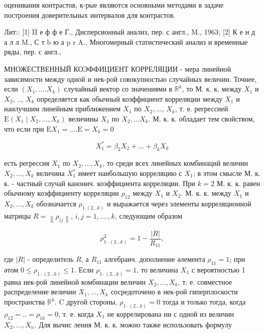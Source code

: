 \documentclass[10pt]{article}
\begin{document}
оценивания контрастов, к-рые являются основными методами в задаче построения доверительных интервалов для контрастов.



Лит:: [1] II е ф ф е Г., Дисперсионный анализ, пер. с англ., M., 1963; [2] К е н д а л л M., С т b ю а p r A., Многомерный статистический анализ и временные ряды, пер. с англ.,



МНОЖЕСТВЕННЫЙ КОЭФФИЦИЕНТ КОРРЕЛЯЦИИ - мера линейной зависимости между одной и нек-рой совокупностью случайных величин. Точнее, если $\left(X_{1}, \ldots . X_{k}\right)$ случайный вектор со значениями в $\mathbb{R}^{k}$, то М. к. к. между $X_{1}$ и $X_{2}$, .., $X_{k}$ определяется как обычный коэффициент корреляции между $X_{1}$ и наилучшим линейным приближением $X_{1}$ по $X_{2}, \ldots$, $X_{k}$, т. е. регрессией $\mathrm{E}\left(X_{1} \mid X_{2}, \ldots, X_{k}\right)$ величины $X_{1}$ по $X_{2}, \ldots X_{k}$. М. к. к. обладает тем свойством, что если при $\mathrm{E} X_{1}=\ldots . \mathrm{E}=X_{k}=0$



\[

X_{1}^{*}=\beta_{2} X_{2}+\ldots+\beta_{k} X_{k}

\]



есть регрессия $X_{1}$ по $X_{2}, \ldots, X_{k}$, то среди всех линейных комбинаций величин $X_{2}, \ldots, X_{k}$ величина $X_{1}^{*}$ имеет наибольшую корреляцию с $X_{1}$; в этом смысле М. к. к. - частный случай канонич. коэффициента корреляции. При $k=2$ М. к. к. равен обычному коэффициенту корреляции $\rho_{12}$ между $X_{1}$ и $X_{2}$. М. к. к. между $X_{1}$ и $X_{2}, \ldots, X_{k}$ обозначается $\rho_{1 .(2 \ldots k)}$ и выражается через элементы корреляционной матрицы $R=\left\|\rho_{i j}\right\|$, $i, j=1, \ldots ., k$, следующим образом



\[

\rho_{1 \cdot(2 \ldots k)}^{2}=1-\frac{|R|}{R_{11}},

\]



где $|R|$ - определитель $R$, а $R_{11}$ алгебраич. дополнение әлемента $\rho_{11}=1$; при әтом $0 \leqslant \rho_{1 \cdot(2 \ldots k)} \leqslant 1$. Если $\rho_{1 \cdot(2 \ldots k)}=1$, то величина $X_{1}$ с вероятностью 1 равна нек-рой линейной комбинации величин $X_{2}, \ldots, X_{k}$, т. е. совместное распределение величин $X_{1}, \ldots, X_{k}$ сосредоточено в нек-рой гиперплоскости пространства $\mathbb{R}^{k}$. $\mathrm{C}$ другой стороны, $\rho_{1 \cdot(2 \ldots k)}=0$ тогда и только тогда, когда $\rho_{12}=. .=\rho_{1 k}=0$, т. е. когда $X_{1}$ не коррелирована ни с одной из величин $X_{2}, \ldots, X_{n}$. Для вычис ления М. к. к. можно также использовать формулу
\end{document}
